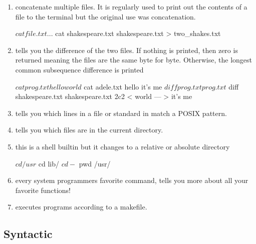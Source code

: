 \begin{enumerate}
\item {} concatenate multiple files. It is regularly used to print out the contents of a file to the terminal but the original use was concatenation.

\begin{code}[language=console]
$ cat file.txt
...
$ cat shakespeare.txt shakespeare.txt > two_shakes.txt
\end{code}

\item {} tells you the difference of the two files. If nothing is printed, then zero is returned meaning the files are the same byte for byte. Otherwise, the longest common subsequence difference is printed

\begin{code}[language=console]
$ cat prog.txt
hello
world
$ cat adele.txt
hello
it's me
$ diff prog.txt prog.txt
$ diff shakespeare.txt shakespeare.txt
2c2
< world
---
> it's me
\end{code}

\item {} tells you which lines in a file or standard in match a POSIX pattern.


\item {} tells you which files are in the current directory.
\item {} this is a shell builtin but it changes to a relative or absolute directory

\begin{code}[language=console]
$ cd /usr
$ cd lib/
$ cd -
$ pwd
/usr/
\end{code}

\item {} every system programmers favorite command, tells you more about all your favorite functions!
\item {} executes programs according to a makefile.

\end{enumerate}

\subsection{Syntactic}

